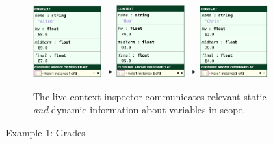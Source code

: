 \begin{figure}[t]
\begin{subfigure}[t]{\textwidth}
\centering
\includegraphics[width=0.29\textwidth,interpolate=false,valign=c]{images/grades-sidebar-1.png}
~${}^\blacktriangleright$
\includegraphics[width=0.29\textwidth,interpolate=false,valign=c]{images/grades-sidebar-2.png}
~${}^\blacktriangleright$
\includegraphics[width=0.29\textwidth,interpolate=false,valign=c]{images/grades-sidebar-3.png}
\caption{The live context inspector communicates relevant static \emph{and} dynamic information about variables in scope.}
\label{fig:grades-sidebar}
\end{subfigure}


\vspace{3px}

\caption{Example 1: Grades}
\label{fig:grades-example}
\vspace{-5px}
\end{figure}
